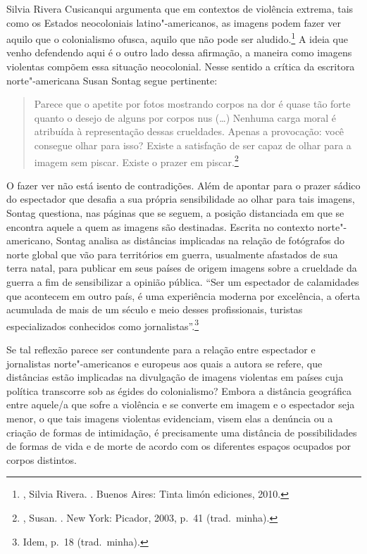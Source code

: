 \asterisc

Silvia Rivera Cusicanqui argumenta que em contextos de violência extrema,
tais como os Estados neocoloniais latino"-americanos, as imagens podem fazer
ver aquilo que o colonialismo ofusca, aquilo que não pode ser
aludido.\footnote{, Silvia Rivera. {}. Buenos Aires: Tinta limón
  ediciones, 2010.} A ideia que venho defendendo aqui é o outro lado
dessa afirmação, a maneira como imagens violentas compõem essa situação
neocolonial. Nesse sentido a crítica da escritora norte"-americana Susan
Sontag segue pertinente:

\begin{quote}
Parece que o apetite por fotos mostrando corpos na dor é quase tão forte quanto o desejo de alguns por corpos nus (\ldots{}) Nenhuma carga moral é atribuída à
representação dessas crueldades. Apenas a provocação: você consegue olhar para isso? Existe a satisfação de ser capaz de olhar para a imagem sem piscar. Existe o prazer em piscar.\footnote{, Susan. {}. New York: Picador, 2003, p.~41 (trad.~minha).}
\end{quote}



O fazer ver não está isento de contradições. Além de apontar para o
prazer sádico do espectador que desafia a sua própria sensibilidade ao
olhar para tais imagens, Sontag questiona, nas páginas que se seguem, a
posição distanciada em que se encontra aquele a quem as imagens são
destinadas. Escrita no contexto norte"-americano, Sontag analisa as
distâncias implicadas na relação de fotógrafos do norte global que vão
para territórios em guerra, usualmente afastados de sua terra natal,
para publicar em seus países de origem imagens sobre a crueldade da
guerra a fim de sensibilizar a opinião pública. ``Ser um espectador de calamidades que acontecem em outro país, é uma experiência moderna por excelência, a oferta acumulada de mais de um século e meio desses profissionais, turistas especializados conhecidos como jornalistas''.\footnote{Idem, p.~18 (trad.~minha).}

Se tal reflexão parece ser contundente para a relação entre espectador e
jornalistas norte"-americanos e europeus aos quais a autora se refere,
que distâncias estão implicadas na divulgação de imagens violentas em
países cuja política transcorre sob as égides do colonialismo? Embora a
distância geográfica entre aquele/a que sofre a violência e se converte
em imagem e o espectador seja menor, o que tais imagens violentas
evidenciam, visem elas a denúncia ou a criação de formas de intimidação,
é precisamente uma distância de possibilidades de formas de vida e de
morte de acordo com os diferentes espaços ocupados por corpos distintos.


